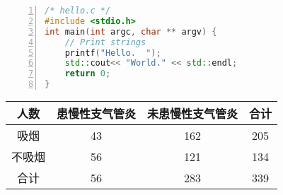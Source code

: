 \documentclass[UTF8]{ctexart}
\begin{document}
\begin{lstlisting}[language={C++},numbers=left, numberstyle=\tiny,keywordstyle=\color{blue!70},commentstyle=\color{red!50!green!50!blue!50},frame=shadowbox, rulesepcolor=\color{red!20!green!20!blue!20}]
/* hello.c */
#include <stdio.h>
int main(int argc, char ** argv) {
	// Print strings
	printf("Hello.  ");
	std::cout<< "World." << std::endl;
	return 0;
}
\end{lstlisting}

\begin{tabular}{|c|cc|c|}
\hline
人数 & 患慢性支气管炎 & 未患慢性支气管炎 & 合计 \\
\hline
吸烟 &43 & 162 & 205 \\
不吸烟 & 56 & 121 & 134 \\
\hline
合计 & 56 & 283 & 339 \\
\hline
\end{tabular}
\end{document}
